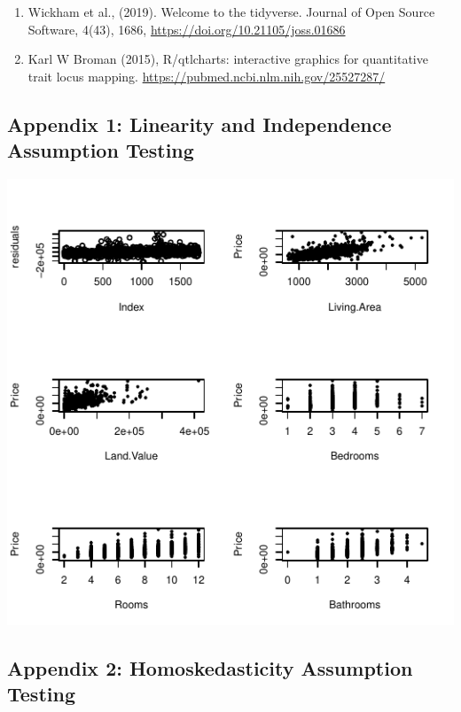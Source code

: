 \documentclass[letterpaper,9pt,twocolumn,twoside,]{pinp}
\providecommand{\tightlist}{%
  \setlength{\itemsep}{0pt}\setlength{\parskip}{0pt}}
\begin{document}
\begin{enumerate}
\def\labelenumi{\arabic{enumi}.}
\tightlist
\item
  Wickham et al., (2019). Welcome to the tidyverse. Journal of Open
  Source Software, 4(43), 1686,
  \url{https://doi.org/10.21105/joss.01686}
\item
  Karl W Broman (2015), R/qtlcharts: interactive graphics for
  quantitative trait locus mapping.
  \url{https://pubmed.ncbi.nlm.nih.gov/25527287/}
\end{enumerate}

\hypertarget{appendix-1-linearity-and-independence-assumption-testing}{%
\subsection{\texorpdfstring{\textbf{Appendix 1: Linearity and
Independence Assumption
Testing}}{Appendix 1: Linearity and Independence Assumption Testing}}\label{appendix-1-linearity-and-independence-assumption-testing}}

\begin{center}\includegraphics{Report_files/figure-latex/unnamed-chunk-4-1} \end{center}

\hypertarget{appendix-2-homoskedasticity-assumption-testing}{%
\subsection{\texorpdfstring{\textbf{Appendix 2: Homoskedasticity
Assumption
Testing}}{Appendix 2: Homoskedasticity Assumption Testing}}\label{appendix-2-homoskedasticity-assumption-testing}}
\end{document}

